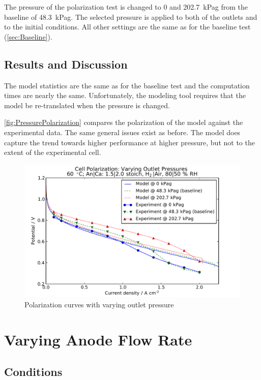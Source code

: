 The pressure of the polarization test is changed to 0 and \SI{202.7}{kPag} from the 
baseline of \SI{48.3}{kPag}.  The selected pressure is applied to both of the outlets and to the initial conditions.  All other settings are the same as for the baseline test (\autoref{sec:Baseline}).

\subsection{Results and Discussion}

The model statistics are the same as for the baseline test and the computation times are nearly the same.  Unfortunately, the modeling tool requires that the model be re-translated when the pressure is changed.

\autoref{fig:PressurePolarization} compares the polarization of the model against the experimental data.  The same general issues exist as before.  The model does capture the trend towards higher performance at higher pressure, but not to the extent of the experimental cell.

\begin{figure}[htbp]
  \includegraphics[width=\linewidth]{Results/Cell/Model/Pressure/Polarization}%
  \caption{Polarization curves with varying outlet pressure}%
  \label{fig:PressurePolarization}
\end{figure}


\FloatBarrier %
\section{Varying Anode Flow Rate}

\subsection{Conditions}

